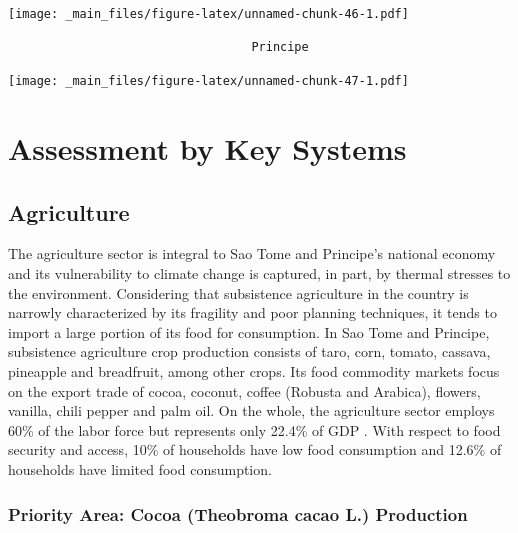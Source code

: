 \documentclass[
]{book}
\begin{document}
\texttt{[image: \_main\_files/figure-latex/unnamed-chunk-46-1.pdf]}

\begin{verbatim}
                                  Principe
\end{verbatim}

\texttt{[image: \_main\_files/figure-latex/unnamed-chunk-47-1.pdf]}

\hypertarget{assessment-by-key-systems-1}{%
\section{Assessment by Key Systems}\label{assessment-by-key-systems-1}}

\hypertarget{agriculture-1}{%
\subsection{Agriculture}\label{agriculture-1}}

The agriculture sector is integral to Sao Tome and Principe's national economy and its vulnerability to climate change is captured, in part, by thermal stresses to the environment. Considering that subsistence agriculture in the country is narrowly characterized by its fragility and poor planning techniques, it tends to import a large portion of its food for consumption. In Sao Tome and Principe, subsistence agriculture crop production consists of taro, corn, tomato, cassava, pineapple and breadfruit, among other crops. Its food commodity markets focus on the export trade of cocoa, coconut, coffee (Robusta and Arabica), flowers, vanilla, chili pepper and palm oil. On the whole, the agriculture sector employs 60\% of the labor force but represents only 22.4\% of GDP . With respect to food security and access, 10\% of households have low food consumption and 12.6\% of households have limited food consumption.

\hypertarget{priority-area-cocoa-theobroma-cacao-l.-production-1}{%
\subsubsection{Priority Area: Cocoa (Theobroma cacao L.) Production}\label{priority-area-cocoa-theobroma-cacao-l.-production-1}}
\end{document}
